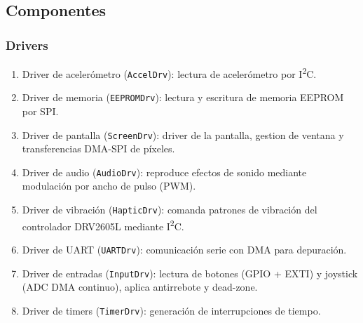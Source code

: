 \documentclass[11pt,a4paper]{article}
\begin{document}
\subsection{Componentes}

\subsubsection{Drivers}
\begin{enumerate}
    \item Driver de acelerómetro (\texttt{AccelDrv}): lectura de acelerómetro por I\textsuperscript{2}C.
    \item Driver de memoria (\texttt{EEPROMDrv}): lectura y escritura de memoria EEPROM por SPI.
    \item Driver de pantalla (\texttt{ScreenDrv}): driver de la pantalla, gestion de ventana y transferencias DMA-SPI de píxeles.
    \item Driver de audio (\texttt{AudioDrv}): reproduce efectos de sonido mediante modulación por ancho de pulso (PWM).
    \item Driver de vibración (\texttt{HapticDrv}): comanda patrones de vibración del controlador DRV2605L mediante I\textsuperscript{2}C.
    \item Driver de UART (\texttt{UARTDrv}): comunicación serie con DMA para depuración.
    \item Driver de entradas (\texttt{InputDrv}): lectura de botones (GPIO + EXTI) y joystick (ADC DMA continuo), aplica antirrebote y dead-zone.
    \item Driver de timers (\texttt{TimerDrv}): generación de interrupciones de tiempo.
\end{enumerate}


\end{document}
